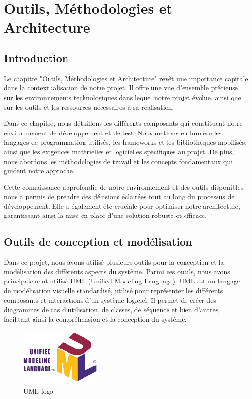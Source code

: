\chapter{Outils, Méthodologies et Architecture}
\label{chap:Chapter 3 title}
\section*{Introduction}

\hspace{\parindent}Le chapitre "Outils, Méthodologies et Architecture" revêt une importance capitale dans la contextualisation de notre projet. Il offre une vue d'ensemble précieuse sur les environnements technologiques dans lequel notre projet évolue, ainsi que sur les outils et les ressources nécessaires à sa réalisation.

Dans ce chapitre, nous détaillons les différents composants qui constituent notre environnement de développement et de test. Nous mettons en lumière les langages de programmation utilisés, les frameworks et les bibliothèques mobilisés, ainsi que les exigences matérielles et logicielles spécifiques au projet. De plus, nous abordons les méthodologies de travail et les concepts fondamentaux qui guident notre approche.

Cette connaissance approfondie de notre environnement et des outils disponibles nous a permis de prendre des décisions éclairées tout au long du processus de développement. Elle a également été cruciale pour optimiser notre architecture, garantissant ainsi la mise en place d'une solution robuste et efficace.

\newpage





\section{Outils de conception et modélisation}


Dans ce projet, nous avons utilisé plusieurs outils pour la conception et la modélisation des différents aspects du système. Parmi ces outils, nous avons principalement utilisé UML (Unified Modeling Language). UML est un langage de modélisation visuelle standardisé, utilisé pour représenter les différents composants et interactions d'un système logiciel. Il permet de créer des diagrammes de cas d'utilisation, de classes, de séquence et bien d'autres, facilitant ainsi la compréhension et la conception du système.
\\
\begin{figure}[H]
    \centering
    \includegraphics[width=4cm]{Figures/UML_logo.svg.png}
    \caption{UML logo}
\end{figure}


